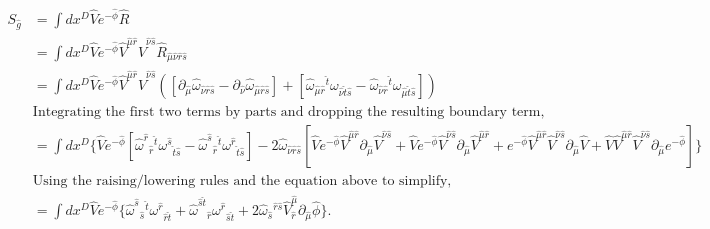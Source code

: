 \documentclass{article}
\begin{document}
\begin{align}
    S_{\hat g} &= \int d x^D\hat V  e^{-\hat \phi} \hat R \nonumber \\
    &= \int d x^D\hat V  e^{-\hat \phi} \hat V^{\hat \mu \hat r} \hat V^{\hat \nu \hat s} \hat R_{\hat \mu \hat \nu \hat r \hat s} \nonumber \\
    &= \int d x^D\hat V e^{-\hat \phi} \hat V^{\hat \mu \hat r} \hat V^{\hat \nu \hat s} \left([\partial_{\hat \mu } \hat \omega_{\hat \nu \hat r \hat s} -\partial_{\hat \nu } \hat \omega_{\hat \mu \hat r \hat s}]+ [\hat \omega_{\hat\mu \hat r}{}^{\hat t}\omega_{\hat\nu \hat t \hat s} - \hat \omega_{\hat\nu \hat r}{}^{\hat t}\omega_{\hat\mu \hat t \hat s}]\right) \nonumber\\
    &\text{Integrating the first two terms by parts and dropping the resulting boundary term,} \nonumber \\
    &= \int d x^D\{  \hat V e^{-\hat \phi}[\hat \omega^{\hat r}{}_{\hat r}{}^{\hat t}\omega^{\hat s}{}_{\hat t \hat s} - \hat \omega^{\hat s}{}_{ \hat r}{}^{\hat t}\omega^{\hat r}{}_{ \hat t \hat s}]- 2\hat \omega_{\hat \nu \hat r \hat s}[\hat V e^{-\hat \phi} \hat V^{\hat \mu \hat r} \partial_{\hat \mu} \hat V^{\hat \nu \hat s} +\hat V e^{-\hat \phi}
    \hat V^{\hat \nu \hat s} \partial_{\hat \mu}\hat V^{\hat \mu \hat r}+ e^{-\hat \phi} \hat V^{\hat \mu \hat r} \hat V^{\hat \nu \hat s} \partial_{\hat \mu}\hat V +\hat V  \hat V^{\hat \mu \hat r} \hat V^{\hat \nu \hat s} \partial_{\hat \mu}e^{-\hat \phi} ] \} \nonumber \\
    &\text{Using the raising/lowering rules and the equation above to simplify,} \nonumber \\
    &= \int d x^D\hat V e^{-\hat \phi} \{  \hat \omega^{\hat s}{}_{\hat s}{}^{\hat t}\omega^{\hat r}{}_{\hat r \hat t} + \hat \omega^{\hat s \hat t}{}_{ \hat r}\omega^{\hat r}{}_{  \hat s \hat t }+ 2\hat \omega_{\hat s}{}^{\hat r \hat s}\hat V^{\hat \mu}_{ \hat r}\partial_{\hat \mu}\hat \phi \}.
\end{align}
\end{document}
